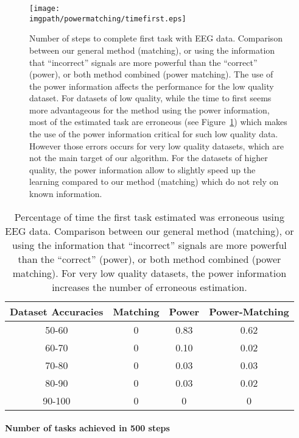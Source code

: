 \begin{figure}[!htbp]
\centering
\texttt{[image: \\imgpath/powermatching/timefirst.eps]}
\caption{Number of steps to complete first task with EEG data. Comparison between our general method (matching), or using the information that ``incorrect'' signals are more powerful than the ``correct'' (power), or both method combined (power matching). The use of the power information affects the performance for the low quality dataset. For datasets of low quality, while the time to first seems more advantageous for the method using the power information, most of the estimated task are erroneous (see Figure~\ref{tab:errorTaskRatio}) which makes the use of the power information critical for such low quality data. However those errors occurs for very low quality datasets, which are not the main target of our algorithm. For the datasets of higher quality, the power information allow to slightly speed up the learning compared to our method (matching) which do not rely on known information.}
\label{fig:timefirst_powermatching}
\end{figure} 

\begin{table}
\centering
{}
\begin{tabular}{c c c c}
    Dataset Accuracies & Matching & Power & Power-Matching \\ \hline
    50-60 & 0 & 0.83 & 0.62 \\ 
    60-70 & 0 & 0.10 & 0.02 \\
    70-80 & 0 & 0.03 & 0.03 \\
    80-90 & 0 & 0.03 & 0.02 \\
    90-100 & 0 & 0 & 0 \\
\end{tabular}
\caption{Percentage of time the first task estimated was erroneous using EEG data. Comparison between our general method (matching), or using the information that ``incorrect'' signals are more powerful than the ``correct'' (power), or both method combined (power matching). For very low quality datasets, the power information increases the number of erroneous estimation.}
\label{tab:errorTaskRatio}
\end{table}


\paragraph{Number of tasks achieved in 500 steps}

